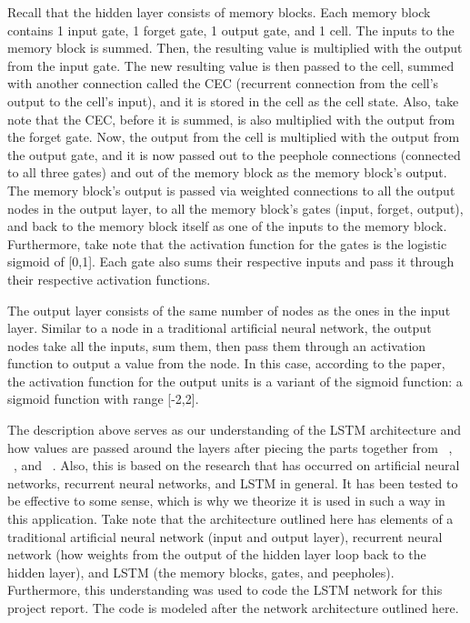 \documentclass[11pt,letterpaper]{article}
\begin{document}
	Recall that the hidden layer consists of memory blocks. Each memory block contains 1 input gate, 1 forget gate, 1 output gate, and 1 cell. The inputs to the memory block is summed. Then, the resulting value is multiplied with the output from the input gate. The new resulting value is then passed to the cell, summed with another connection called the CEC (recurrent connection from the cell's output to the cell's input), and it is stored in the cell as the cell state. Also, take note that the CEC, before it is summed, is also multiplied with the output from the forget gate. Now, the output from the cell is multiplied with the output from the output gate, and it is now passed out to the peephole connections (connected to all three gates) and out of the memory block as the memory block's output. The memory block's output is passed via weighted connections to all the output nodes in the output layer, to all the memory block's gates (input, forget, output), and back to the memory block itself as one of the inputs to the memory block. Furthermore, take note that the activation function for the gates is the logistic sigmoid of [0,1]. Each gate also sums their respective inputs and pass it through their respective activation functions.

	The output layer consists of the same number of nodes as the ones in the input layer. Similar to a node in a traditional artificial neural network, the output nodes take all the inputs, sum them, then pass them through an activation function to output a value from the node. In this case, according to the paper, the activation function for the output units is a variant of the sigmoid function: a sigmoid function with range [-2,2].

	The description above serves as our understanding of the LSTM architecture and how values are passed around the layers after piecing the parts together from ~\cite{Gers:99}, ~\cite{Gers:01}, and ~\cite{Gers:02}. Also, this is based on the research that has occurred on artificial neural networks, recurrent neural networks, and LSTM in general. It has been tested to be effective to some sense, which is why we theorize it is used in such a way in this application. Take note that the architecture outlined here has elements of a traditional artificial neural network (input and output layer), recurrent neural network (how weights from the output of the hidden layer loop back to the hidden layer), and LSTM (the memory blocks, gates, and peepholes). Furthermore, this understanding was used to code the LSTM network for this project report. The code is modeled after the network architecture outlined here.
\end{document}
